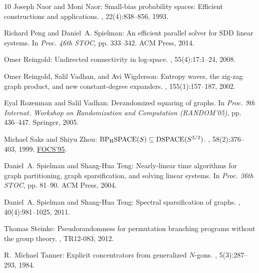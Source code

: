 \documentclass[11pt]{article}
\numberwithin{equation}{section}
\theoremstyle{definition}
\theoremstyle{plain}
\numberwithin{myalgctr}{section}
\theoremstyle{named}
\begin{document}
\begin{thebibliography}{10}
{\sc Joseph Naor and Moni Naor}: Small-bias probability spaces: {E}fficient
  constructions and applications.
, 22(4):838--856, 1993.
\newblock [\epfmtdoi{10.1137/0222053}]

{\sc Richard Peng and Daniel~A. Spielman}: An efficient parallel solver for
  {SDD} linear systems.
\newblock In {\em Proc. 46th STOC}, pp. 333--342. ACM Press, 2014.
\newblock [\epfmtdoi{10.1145/2591796.2591832}]

{\sc Omer Reingold}: Undirected connectivity in log-space.
, 55(4):17:1--24, 2008.
\newblock [\epfmtdoi{10.1145/1391289.1391291}]

{\sc Omer Reingold, Salil Vadhan, and Avi Wigderson}: Entropy waves, the
  zig-zag graph product, and new constant-degree expanders.
, 155(1):157--187, 2002.
\newblock [\epfmtdoi{10.2307/3062153}]

{\sc Eyal Rozenman and Salil Vadhan}: Derandomized squaring of graphs.
\newblock In {\em Proc. 9th Internat. Workshop on Randomization and Computation
  (RANDOM'05)}, pp. 436--447. Springer, 2005.
\newblock [\epfmtdoi{10.1007/11538462\_37}]

{\sc Michael Saks and Shiyu Zhou}: {${\rm BP}\sb {\rm H}{\rm
  SPACE}(S)\subseteq{\rm DSPACE}(S\sp {3/2})$}.
, 58(2):376--403, 1999.
\newblock \prelim \href{https://doi.org/10.1109/SFCS.1995.492490}{FOCS'95}.

{\sc Daniel~A. Spielman and Shang-Hua Teng}: Nearly-linear time algorithms for
  graph partitioning, graph sparsification, and solving linear systems.
\newblock In {\em Proc. 36th STOC}, pp. 81--90. ACM Press, 2004.
\newblock [\epfmtdoi{10.1145/1007352.1007372}]

{\sc Daniel~A. Spielman and Shang-Hua Teng}: Spectral sparsification of graphs.
, 40(4):981--1025, 2011.
\newblock [\epfmtdoi{10.1137/08074489X}]

{\sc Thomas Steinke}: Pseudorandomness for permutation branching programs
  without the group theory.
, TR12-083, 2012.

{\sc R.~Michael Tanner}: Explicit concentrators from generalized {$N$}-gons.
, 5(3):287--293, 1984.
\newblock [\epfmtdoi{10.1137/0605030}]

\end{thebibliography}
\end{document}
